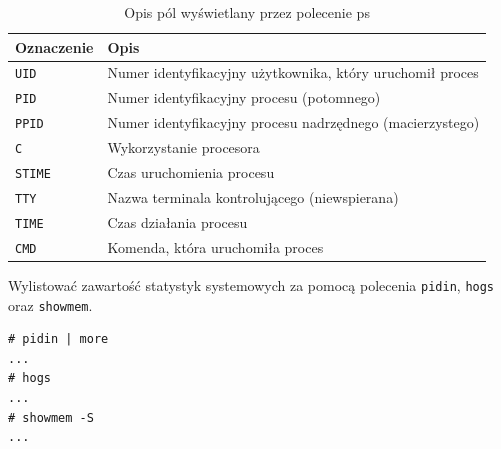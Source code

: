 \begin{example}
\begin{table}[h!]
\centering
\caption{Opis pól wyświetlany przez polecenie ps}
\setlength{\arrayrulewidth}{1pt}
\setlength{\tabcolsep}{6pt}
\renewcommand{\arraystretch}{1.2}
\begin{tabular}{ |p{}|p{}|}
\hline \rowcolor{gray}
\textbf{Oznaczenie} & \textbf{Opis} \\ \hline
\mbox{\lstinline[style=MyBashStyle]{UID}} & Numer identyfikacyjny użytkownika, który uruchomił proces \\ \hline 
\mbox{\lstinline[style=MyBashStyle]{PID}} & Numer identyfikacyjny procesu (potomnego) \\ \hline 
\mbox{\lstinline[style=MyBashStyle]{PPID}}  & Numer identyfikacyjny procesu nadrzędnego (macierzystego) \\ \hline
\mbox{\lstinline[style=MyBashStyle]{C}}  & Wykorzystanie procesora \\ \hline
\mbox{\lstinline[style=MyBashStyle]{STIME}}  & Czas uruchomienia procesu \\ \hline
\mbox{\lstinline[style=MyBashStyle]{TTY}}  & Nazwa terminala kontrolującego (niewspierana) \\ \hline
\mbox{\lstinline[style=MyBashStyle]{TIME}}  & Czas działania procesu \\ \hline
\mbox{\lstinline[style=MyBashStyle]{CMD}}  & Komenda, która uruchomiła proces \\ \hline
\end{tabular}
\label{tab:opispol}
\end{table}

Wylistować zawartość statystyk systemowych za pomocą polecenia \lstinline[style=MyBashStyle]{pidin}, \lstinline[style=MyBashStyle]{hogs} oraz \lstinline[style=MyBashStyle]{showmem}. 

\begin{lstlisting}[style=MyBashStyle,deletekeywords={ps}] 
# pidin | more
... 
# hogs
...
# showmem -S
...
\end{lstlisting}

\end{example} 



